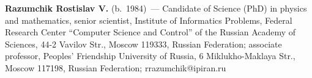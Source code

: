     \vspace*{3pt}
    
    \noindent
    \textbf{Razumchik Rostislav V.} (b.\ 1984)~--- Candidate of Science (PhD) in 
    physics and mathematics, senior scientist, Institute of Informatics Problems, 
    Federal Research Center ``Computer Science and Control'' of the Russian Academy 
    of Sciences, 44-2 Vavilov Str., Moscow 119333, Russian Federation; 
    associate professor, Peoples' Friendship University of Russia, 
    6 Miklukho-Maklaya Str., Moscow 117198, Russian Federation; rrazumchik@ipiran.ru 
    
    
\label{end\stat}


\renewcommand{\bibname}{\protect\rm Литература}